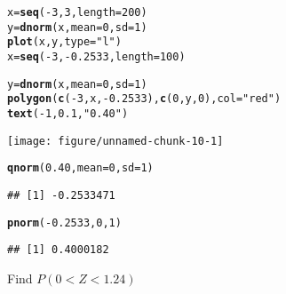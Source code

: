 \documentclass{article}\usepackage[]{graphicx}\usepackage[]{xcolor}
\makeatletter
\def\maxwidth{ %
  \ifdim\Gin@nat@width>\linewidth
    \linewidth
  \else
    \Gin@nat@width
  \fi
}
\newcommand{\hlnum}[1]{\textcolor[rgb]{0.686,0.059,0.569}{#1}}%
\newcommand{\hlsng}[1]{\textcolor[rgb]{0.192,0.494,0.8}{#1}}%
\newcommand{\hlopt}[1]{\textcolor[rgb]{0,0,0}{#1}}%
\newcommand{\hldef}[1]{\textcolor[rgb]{0.345,0.345,0.345}{#1}}%
\newcommand{\hlkwb}[1]{\textcolor[rgb]{0.69,0.353,0.396}{#1}}%
\newcommand{\hlkwc}[1]{\textcolor[rgb]{0.333,0.667,0.333}{#1}}%
\newcommand{\hlkwd}[1]{\textcolor[rgb]{0.737,0.353,0.396}{\textbf{#1}}}%
\newenvironment{kframe}{%
 \def\at@end@of@kframe{}%
 \ifinner\ifhmode%
  \def\at@end@of@kframe{\end{minipage}}%
  \begin{minipage}{\columnwidth}%
 \fi\fi%
 \def\FrameCommand##1{\hskip\@totalleftmargin \hskip-\fboxsep
 \colorbox{shadecolor}{##1}\hskip-\fboxsep
     \hskip-\linewidth \hskip-\@totalleftmargin \hskip\columnwidth}%
 \MakeFramed {\advance\hsize-\width
   \@totalleftmargin\z@ \linewidth\hsize
   \@setminipage}}%
 {\par\unskip\endMakeFramed%
 \at@end@of@kframe}
\newenvironment{knitrout}{}{} %
\makeatother
\begin{document}
\begin{knitrout}
\color{fgcolor}\begin{kframe}
\begin{alltt}
\hldef{x}\hlkwb{=}\hlkwd{seq}\hldef{(}\hlopt{-}\hlnum{3}\hldef{,}\hlnum{3}\hldef{,}\hlkwc{length}\hldef{=}\hlnum{200}\hldef{)}
\hldef{y}\hlkwb{=}\hlkwd{dnorm}\hldef{(x,}\hlkwc{mean}\hldef{=}\hlnum{0}\hldef{,}\hlkwc{sd}\hldef{=}\hlnum{1}\hldef{)}
\hlkwd{plot}\hldef{(x,y,}\hlkwc{type}\hldef{=}\hlsng{"l"}\hldef{)}
\hldef{x}\hlkwb{=}\hlkwd{seq}\hldef{(}\hlopt{-}\hlnum{3}\hldef{,}\hlopt{-}\hlnum{0.2533}\hldef{,}\hlkwc{length}\hldef{=}\hlnum{100}\hldef{)}

\hldef{y}\hlkwb{=}\hlkwd{dnorm}\hldef{(x,}\hlkwc{mean}\hldef{=}\hlnum{0}\hldef{,}\hlkwc{sd}\hldef{=}\hlnum{1}\hldef{)}
\hlkwd{polygon}\hldef{(}\hlkwd{c}\hldef{(}\hlopt{-}\hlnum{3}\hldef{,x,}\hlopt{-}\hlnum{0.2533}\hldef{),}\hlkwd{c}\hldef{(}\hlnum{0}\hldef{,y,}\hlnum{0}\hldef{),}\hlkwc{col}\hldef{=}\hlsng{"red"}\hldef{)}
\hlkwd{text}\hldef{(}\hlopt{-}\hlnum{1}\hldef{,}\hlnum{0.1}\hldef{,}\hlsng{"0.40"}\hldef{)}
\end{alltt}
\end{kframe}
\texttt{[image: figure/unnamed-chunk-10-1]} 
\begin{kframe}\begin{alltt}
\hlkwd{qnorm}\hldef{(}\hlnum{0.40}\hldef{,}\hlkwc{mean}\hldef{=}\hlnum{0}\hldef{,}\hlkwc{sd}\hldef{=}\hlnum{1}\hldef{)}
\end{alltt}
\begin{verbatim}
## [1] -0.2533471
\end{verbatim}
\begin{alltt}
\hlkwd{pnorm}\hldef{(}\hlopt{-}\hlnum{0.2533}\hldef{,} \hlnum{0}\hldef{,} \hlnum{1}\hldef{)}
\end{alltt}
\begin{verbatim}
## [1] 0.4000182
\end{verbatim}
\end{kframe}
\end{knitrout}
Find $P(0<Z<1.24)$
\end{document}
